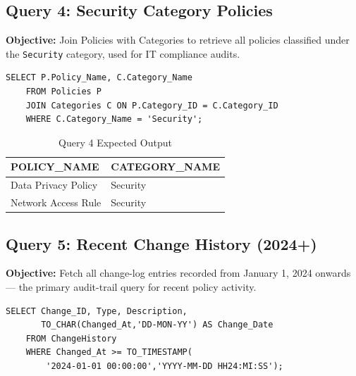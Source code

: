 \documentclass[conference]{IEEEtran}
\begin{document}
\subsection{Query 4: Security Category Policies}

\textbf{Objective:} Join Policies with Categories to retrieve all policies classified under the \texttt{Security} category, used for IT compliance audits.

\begin{lstlisting}[style=sqlstyle, caption={Query 4: Security Policies (JOIN)}]
SELECT P.Policy_Name, C.Category_Name
    FROM Policies P
    JOIN Categories C ON P.Category_ID = C.Category_ID
    WHERE C.Category_Name = 'Security';
\end{lstlisting}

\begin{table}[H]
\centering
\caption{Query 4 Expected Output}
\begin{tabular}{|l|l|}
\hline
\textbf{POLICY\_NAME} & \textbf{CATEGORY\_NAME} \\
\hline
Data Privacy Policy & Security \\
Network Access Rule & Security \\
\hline
\end{tabular}
\end{table}

\subsection{Query 5: Recent Change History (2024+)}

\textbf{Objective:} Fetch all change-log entries recorded from January 1, 2024 onwards — the primary audit-trail query for recent policy activity.

\begin{lstlisting}[style=sqlstyle, caption={Query 5: Change History Since 2024}]
SELECT Change_ID, Type, Description,
       TO_CHAR(Changed_At,'DD-MON-YY') AS Change_Date
    FROM ChangeHistory
    WHERE Changed_At >= TO_TIMESTAMP(
        '2024-01-01 00:00:00','YYYY-MM-DD HH24:MI:SS');
\end{lstlisting}
\end{document}

